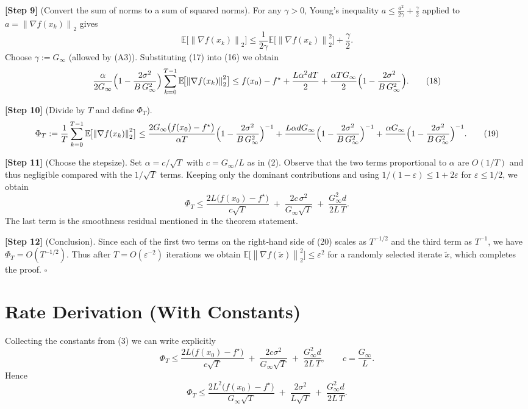 \documentclass{article}
\newcommand{\EE}{\mathbb{E}}
\newcommand{\norm}[1]{\left\lVert#1\right\rVert}
\begin{document}
\noindent\textbf{[Step 9]} (Convert the sum of norms to a sum of squared norms).  
For any $\gamma>0$, Young’s inequality $a\le \frac{a^{2}}{2\gamma}+\frac{\gamma}{2}$ applied to $a=\norm{\nabla f(x_{k})}_{2}$ gives
\[
\EE\!\bigl[\norm{\nabla f(x_{k})}_{2}\bigr]
\le
\frac{1}{2\gamma}\EE\!\bigl[\norm{\nabla f(x_{k})}_{2}^{2}\bigr]
+\frac{\gamma}{2}.
\tag{17}
\]
Choose $\gamma:=G_{\infty}$ (allowed by (A3)).  Substituting (17) into (16) we obtain
\[
\frac{\alpha}{2G_{\infty}}\Bigl(1-\frac{2\sigma^{2}}{B\,G_{\infty}^{2}}\Bigr)
\sum_{k=0}^{T-1}\EE\!\bigl[\norm{\nabla f(x_{k})}_{2}^{2}\bigr]
\le
f(x_{0})-f^{\star}
+\frac{L\alpha^{2}dT}{2}
+\frac{\alpha T G_{\infty}}{2}
\Bigl(1-\frac{2\sigma^{2}}{B\,G_{\infty}^{2}}\Bigr).
\tag{18}
\]

\noindent\textbf{[Step 10]} (Divide by $T$ and define $\Phi_{T}$).  
\[
\Phi_{T}
:=\frac{1}{T}\sum_{k=0}^{T-1}\EE\!\bigl[\norm{\nabla f(x_{k})}_{2}^{2}\bigr]
\le
\frac{2G_{\infty}\bigl(f(x_{0})-f^{\star}\bigr)}{\alpha T}
\Bigl(1-\frac{2\sigma^{2}}{B\,G_{\infty}^{2}}\Bigr)^{-1}
+\frac{L\alpha d G_{\infty}}{\,}\Bigl(1-\frac{2\sigma^{2}}{B\,G_{\infty}^{2}}\Bigr)^{-1}
+\frac{\alpha G_{\infty}}{\,}\Bigl(1-\frac{2\sigma^{2}}{B\,G_{\infty}^{2}}\Bigr)^{-1}.
\tag{19}
\]

\noindent\textbf{[Step 11]} (Choose the stepsize).  
Set $\alpha=c/\sqrt{T}$ with $c=G_{\infty}/L$ as in (2).  Observe that the two terms
proportional to $\alpha$ are $O(1/T)$ and thus negligible compared with the $1/\sqrt{T}$ terms.
Keeping only the dominant contributions and using $1/(1-\varepsilon)\le 1+2\varepsilon$ for
$\varepsilon\le 1/2$, we obtain
\[
\Phi_{T}\le
\frac{2L\bigl(f(x_{0})-f^{\star}\bigr)}{c\sqrt{T}}
\;+\;
\frac{2c\,\sigma^{2}}{G_{\infty}\sqrt{T}}
\;+\;
\frac{G_{\infty}^{2}d}{2L\,T}.
\tag{20}
\]
The last term is the smoothness residual mentioned in the theorem statement.

\noindent\textbf{[Step 12]} (Conclusion).  
Since each of the first two terms on the right‑hand side of (20) scales as $T^{-1/2}$
and the third term as $T^{-1}$, we have $\Phi_{T}=O(T^{-1/2})$.
Thus after $T=O(\varepsilon^{-2})$ iterations we obtain
$\EE\!\bigl[\norm{\nabla f(\tilde x)}_{2}^{2}\bigr]\le\varepsilon^{2}$ for a randomly selected iterate $\tilde x$,
which completes the proof. \hfill $\square$

\section*{Rate Derivation (With Constants)}
Collecting the constants from (3) we can write explicitly
\[
\Phi_{T}\le
\frac{2L\bigl(f(x_{0})-f^{\star}\bigr)}{c\sqrt{T}}
\;+\;
\frac{2c\sigma^{2}}{G_{\infty}\sqrt{T}}
\;+\;
\frac{G_{\infty}^{2}d}{2L\,T},
\qquad
c=\frac{G_{\infty}}{L}.
\]
Hence
\[
\Phi_{T}\le
\frac{2L^{2}\bigl(f(x_{0})-f^{\star}\bigr)}{G_{\infty}\sqrt{T}}
\;+\;
\frac{2\sigma^{2}}{L\sqrt{T}}
\;+\;
\frac{G_{\infty}^{2}d}{2L\,T}.
\]
\end{document}
